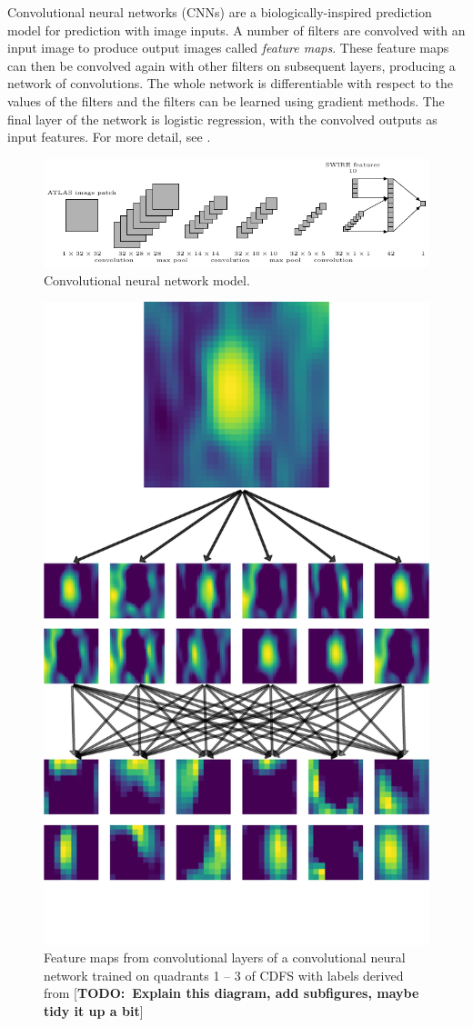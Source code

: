\documentclass[fleqn,usenatbib,usedcolumn]{mnras}
\newcommand{\todo}[1]{ {\color{red}[{\bf TODO:~{#1}}]} }
\begin{document}
      Convolutional neural networks (CNNs) are a biologically-inspired
      prediction model for prediction with image inputs. A number of filters
      are convolved with an input image to produce output images called
      \emph{feature maps}. These feature maps can then be convolved again with
      other filters on subsequent layers, producing a network of convolutions.
      The whole network is differentiable with respect to the values of the
      filters and the filters can be learned using gradient methods. The final
      layer of the network is logistic regression, with the convolved outputs
      as input features. For more detail, see \citet[\S II.A][]{lecun98}.

      \begin{figure}
        \centering
        \includegraphics[width=\textwidth]{convnet.pdf}
        \caption{Convolutional neural network model.}
        \label{fig:cnn}
      \end{figure}

      \begin{figure}
      \centering
      \includegraphics[width=0.6\columnwidth]{convolutions_42191.pdf}
      \caption{Feature maps from convolutional layers of a convolutional neural
        network trained on quadrants 1 -- 3 of CDFS with labels derived from
        \citeauthor{norris06} \todo{Explain this diagram, add subfigures, maybe tidy it up a bit}}
      \label{fig:cnn-outputs}
      \end{figure}
\end{document}
